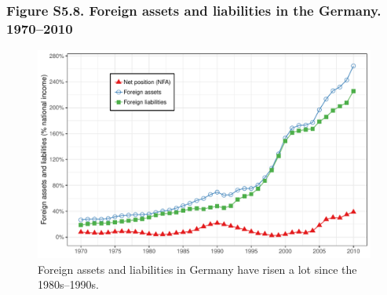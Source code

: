 \documentclass[t]{beamer}\usepackage[]{graphicx}\usepackage[]{color}
\makeatletter
\def\maxwidth{ %
  \ifdim\Gin@nat@width>\linewidth
    \linewidth
  \else
    \Gin@nat@width
  \fi
}
\newenvironment{knitrout}{}{} %
\makeatother
\begin{document}
\begin{frame}[label=Figure_S5_8]
\frametitle{Figure S5.8. Foreign assets and liabilities in the Germany. 1970--2010}
\begin{figure}[t]
\begin{minipage}[b]{\textwidth}
\centering
\begin{knitrout}\footnotesize
{}\color{fgcolor}

{\centering \includegraphics[width=\maxwidth]{figures/color/Figure_S5_8} 

}



\end{knitrout}
\caption{Foreign assets and liabilities in Germany have risen a lot since the 1980s--1990s.}
\end{minipage}
\end{figure}
\end{frame}
\end{document}
